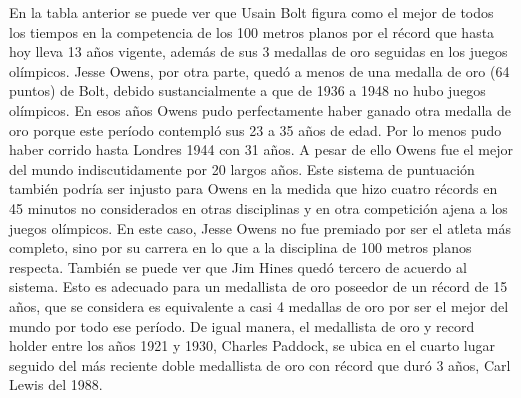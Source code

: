 \documentclass[a4paper]{article}
\begin{document}
En la tabla anterior se puede ver que Usain Bolt figura como el mejor de todos los tiempos en la competencia de los 100 metros planos por el récord que hasta hoy lleva 13 años vigente, además de sus 3 medallas de oro seguidas en los juegos olímpicos. Jesse Owens, por otra parte, quedó a menos de una medalla de oro (64 puntos) de Bolt, debido sustancialmente a que de 1936 a 1948 no hubo juegos olímpicos. En esos años Owens pudo perfectamente haber ganado otra medalla de oro porque este período contempló sus 23 a 35 años de edad. Por lo menos pudo haber corrido hasta Londres 1944 con 31 años. \newline\newline A pesar de ello Owens fue el mejor del mundo indiscutidamente por 20 largos años. Este sistema de puntuación también podría ser injusto para Owens en la medida que hizo cuatro récords en 45 minutos no considerados en otras disciplinas y en otra competición ajena a los juegos olímpicos. En este caso, Jesse Owens no fue premiado por ser el atleta más completo, sino por su carrera en lo que a la disciplina de 100 metros planos respecta. \newline\newline También se puede ver que Jim Hines quedó tercero de acuerdo al sistema. Esto es adecuado para un medallista de oro poseedor de un récord de 15 años, que se considera es equivalente a casi 4 medallas de oro por ser el mejor del mundo por todo ese período.  \newline\newline De igual manera, el medallista de oro y record holder entre los años 1921 y 1930, Charles Paddock, se ubica en el cuarto lugar seguido del más reciente doble medallista de oro con récord que duró 3 años, Carl Lewis del 1988.
\end{document}
